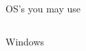 \begin{frame}{OS's you may use}
\begin{columns}[T]
		Windows\\
		\uncover<3->{\textcolor{orange}{supported}}
		\centering

\end{columns}
\end{frame}
